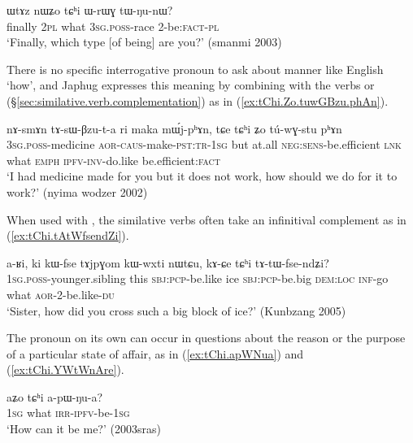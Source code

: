 \begin{exe}
\ex \label{ex:tChi.WrWG}
\gll ɯtɤz nɯʑo tɕʰi ɯ-rɯɣ tɯ-ŋu-nɯ? \\
finally \textsc{2pl} what  \textsc{3sg}.\textsc{poss}-race  2-be:\textsc{fact}-\textsc{pl} \\
\glt `Finally, which type [of being] are you?' (smanmi 2003)
\end{exe}  

There is no specific interrogative pronoun to ask about manner like English `how', and Japhug expresses this meaning by combining  with the verbs  or  (§\ref{sec:similative.verb.complementation}) as in (\ref{ex:tChi.Zo.tuwGBzu.phAn}).


\begin{exe}
\ex \label{ex:tChi.Zo.tuwGBzu.phAn}
\gll nɤ-smɤn tɤ-sɯ-βzu-t-a ri maka mɯ́j-pʰɤn, tɕe tɕʰi ʑo tú-wɣ-stu pʰɤn \\
\textsc{3sg}.\textsc{poss}-medicine \textsc{aor}-\textsc{caus}-make-\textsc{pst}:\textsc{tr}-\textsc{1sg} but at.all \textsc{neg}:\textsc{sens}-be.efficient \textsc{lnk} what \textsc{emph} \textsc{ipfv}-\textsc{inv}-do.like be.efficient:\textsc{fact} \\
\glt `I had medicine made for you but it does not work, how should we do for it to work?' (nyima wodzer 2002) 
\end{exe}  

When used with , the similative verbs often take an infinitival complement as in (\ref{ex:tChi.tAtWfsendZi}).

\begin{exe}
\ex \label{ex:tChi.tAtWfsendZi}
\gll a-ʁi, ki kɯ-fse tɤjpɣom kɯ-wxti nɯtɕu, kɤ-ɕe tɕʰi tɤ-tɯ-fse-ndʑi? \\
\textsc{1sg}.\textsc{poss}-younger.sibling this \textsc{sbj}:\textsc{pcp}-be.like ice \textsc{sbj}:\textsc{pcp}-be.big \textsc{dem}:\textsc{loc} \textsc{inf}-go what \textsc{aor}-2-be.like-\textsc{du} \\
\glt `Sister, how did you cross such a big block of ice?' (Kunbzang 2005)
\end{exe}  
 
The pronoun  on its own can occur in questions about the reason or the purpose of a particular state of affair, as in (\ref{ex:tChi.apWNua}) and (\ref{ex:tChi.YWtWnAre}).

\begin{exe}
\ex \label{ex:tChi.apWNua}
\gll  aʑo tɕʰi a-pɯ-ŋu-a? \\
\textsc{1sg} what \textsc{irr}-\textsc{ipfv}-be-\textsc{1sg} \\
\glt `How can it be me?' (2003sras)
\end{exe}  


